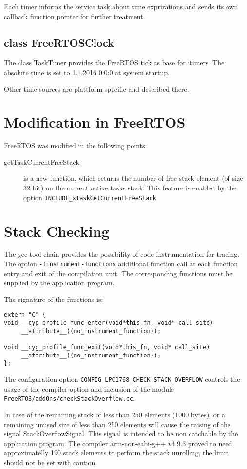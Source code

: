 Each timer informs the service task about time exprirations and 
sends its own callback function pointer for further treatment.

\subsection{class FreeRTOSClock}
The class TaskTimer provides the FreeRTOS tick as
base for itimers.
The absolute time is set to 1.1.2016 0:0:0 at system startup.

Other time sources are plattform specific and described there.

\section{Modification in FreeRTOS}
FreeRTOS was modified in the following points:
\begin{description}
\item[getTaskCurrentFreeStack] is a new function, which returns the number
   of free stack element (of size 32 bit) on the current active tasks stack.
   This feature is enabled by the option
    \texttt{INCLUDE\_xTaskGetCurrentFreeStack}
\end{description}

\section{Stack Checking}
The gcc tool chain provides the possibility of code instrumentation
for tracing. The option \texttt{-finstrument-functions} additional
function call at each function entry and exit of the compilation unit.
The corresponding functions must be supplied by the application program.

The signature of the functions is:
\begin{verbatim}
extern "C" {
void __cyg_profile_func_enter(void*this_fn, void* call_site)
     __attribute__((no_instrument_function));

void __cyg_profile_func_exit(void*this_fn, void* call_site)
     __attribute__((no_instrument_function));
};
\end{verbatim}

The configuration option \texttt{CONFIG\_LPC1768\_CHECK\_STACK\_OVERFLOW}
controls the usage of the compiler option and inclusion of the
module \texttt{FreeRTOS/addOns/checkStackOverflow.cc}.


In case of the remaining stack of less than 250 elements (1000 bytes), or a
remaining unused size of less than 250 elements will cause the raising
of the signal StackOverflowSignal. This signal is intended to be non catchable
by the application program. 
The compiler arm-non-eabi-g++ v4.9.3 proved to need approximatelly 190 stack elements to perform the stack unrolling, the limit should not be set with caution.

